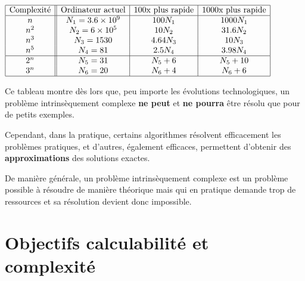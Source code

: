 \begin{center}
	$\begin{array}{|c||c|c|c|}
			\hline
			\text{Complexité} & \text{Ordinateur actuel} & \text{100x plus rapide} & \text{1000x plus rapide} \\
			\hline
			n                 & N_1 = 3.6\times 10^9     & 100 N_1                 & 1000 N_1                 \\
			n^2               & N_2 = 6\times 10^5       & 10 N_2                  & 31.6 N_2                 \\
			n^3               & N_3 = 1530               & 4.64 N_3                & 10 N_3                   \\
			n^5               & N_4 = 81                 & 2.5 N_4                 & 3.98 N_4                 \\
			\hline
			2^n               & N_5 = 31                 & N_5 + 6                 & N_5 + 10                 \\
			3^n               & N_6 = 20                 & N_6 + 4                 & N_6 + 6                  \\
			\hline
		\end{array}$
\end{center}

Ce tableau montre dès lors que, peu importe les évolutions technologiques, un problème intrinsèquement complexe \textbf{ne peut} et \textbf{ne pourra} être résolu que pour de petits exemples.

Cependant, dans la pratique, certains algorithmes résolvent efficacement les problèmes pratiques, et d'autres, également efficaces, permettent d'obtenir des \textbf{approximations} des solutions exactes.

De manière générale, un problème intrinsèquement complexe est un problème possible à résoudre de manière théorique mais qui en pratique demande trop de ressources et sa résolution devient donc impossible.
\section{Objectifs calculabilité et complexité}
\label{sec:objectifs_calculabilite_et_complexite}

